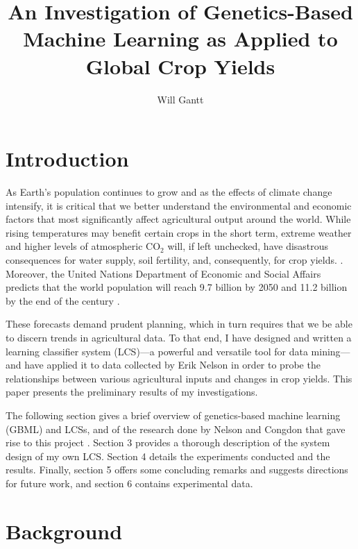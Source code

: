 \documentclass[12pt]{article}
\begin{document}
\title{An Investigation of Genetics-Based Machine Learning as Applied to Global Crop Yields}
\author{Will Gantt}
\maketitle
\clearpage

\section{Introduction}

As Earth's population continues to grow and as the effects of climate change intensify, it is critical that we better understand the environmental and economic factors that most significantly affect agricultural output around the world. While rising temperatures may benefit certain crops in the short term, extreme weather and higher levels of atmospheric $\text{CO}_2$ will, if left unchecked, have disastrous consequences for water supply, soil fertility, and, consequently, for crop yields. \cite{us_epa_climate_2017}. Moreover, the United Nations Department of Economic and Social Affairs predicts that the world population will reach 9.7 billion by 2050 and 11.2 billion by the end of the century \cite{noauthor_world_2015}.

These forecasts demand prudent planning, which in turn requires that we be able to discern trends in agricultural data. To that end, I have designed and written a learning classifier system (LCS)---a powerful and versatile tool  for data mining---and have applied it to data collected by Erik Nelson in order to probe the relationships between various agricultural inputs and changes in crop yields.
This paper presents the preliminary results of my investigations.

The following section gives a brief overview of genetics-based machine learning (GBML) and LCSs, and of the research done by Nelson and Congdon that gave rise to this project \cite{nelson_measuring_2016}. Section 3 provides a thorough description of the system design of my own LCS. Section 4 details the experiments conducted and the results. Finally, section 5 offers some concluding remarks and suggests directions for future work, and section 6 contains experimental data.

\section{Background}
\end{document}
